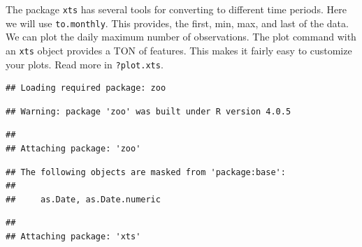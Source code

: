 \documentclass[
  10pt,
]{article}
\newenvironment{Shaded}{\begin{snugshade}}{\end{snugshade}}
\newcommand{\AttributeTok}[1]{\textcolor[rgb]{0.77,0.63,0.00}{#1}}
\newcommand{\DecValTok}[1]{\textcolor[rgb]{0.00,0.00,0.81}{#1}}
\newcommand{\FunctionTok}[1]{\textcolor[rgb]{0.00,0.00,0.00}{#1}}
\newcommand{\NormalTok}[1]{#1}
\newcommand{\OtherTok}[1]{\textcolor[rgb]{0.56,0.35,0.01}{#1}}
\newcommand{\SpecialCharTok}[1]{\textcolor[rgb]{0.00,0.00,0.00}{#1}}
\newcommand{\StringTok}[1]{\textcolor[rgb]{0.31,0.60,0.02}{#1}}
\begin{document}
The package \texttt{xts} has several tools for converting to different time periods. Here we
will use \texttt{to.monthly}. This provides, the first, min, max, and last of the data.
We can plot the daily maximum number of observations. The plot command with an
\texttt{xts} object provides a TON of features. This makes it fairly easy to customize
your plots. Read more in \texttt{?plot.xts}.

\begin{Shaded}
\end{Shaded}

\begin{verbatim}
## Loading required package: zoo
\end{verbatim}

\begin{verbatim}
## Warning: package 'zoo' was built under R version 4.0.5
\end{verbatim}

\begin{verbatim}
## 
## Attaching package: 'zoo'
\end{verbatim}

\begin{verbatim}
## The following objects are masked from 'package:base':
## 
##     as.Date, as.Date.numeric
\end{verbatim}

\begin{verbatim}
## 
## Attaching package: 'xts'
\end{verbatim}
\end{document}
